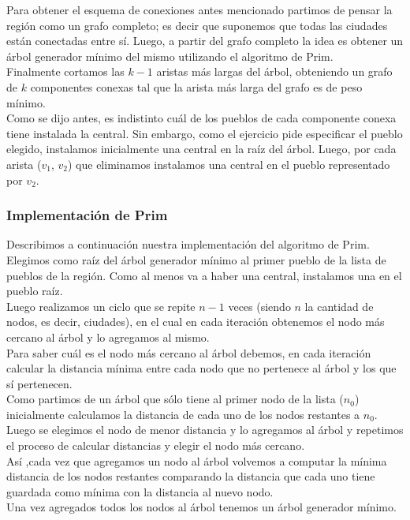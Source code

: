 Para obtener el esquema de conexiones antes mencionado partimos de pensar la regi\'on como un grafo completo; es decir que suponemos que todas las ciudades est\'an conectadas entre s\'i. Luego, a partir del grafo completo la idea es obtener un \'arbol generador m\'inimo del mismo utilizando el algoritmo de Prim.\\
Finalmente cortamos las $k - 1$ aristas m\'as largas del \'arbol, obteniendo un grafo de $k$ componentes conexas tal que la arista m\'as larga del grafo es de peso m\'inimo.\\ 
Como se dijo antes, es indistinto cu\'al de los pueblos de cada componente conexa tiene instalada la central. Sin embargo, como el ejercicio pide especificar el pueblo elegido, instalamos inicialmente una central en la ra\'iz del \'arbol. Luego, por cada arista ($v_1$, $v_2$) que eliminamos instalamos una central en el pueblo representado por $v_2$. %

\subsubsection{Implementaci\'on de Prim}
Describimos a continuaci\'on nuestra implementaci\'on del algoritmo de Prim.\\

Elegimos como ra\'iz del \'arbol generador m\'inimo al primer pueblo de la lista de pueblos de la regi\'on. Como al menos va a haber una central, instalamos una en el pueblo ra\'iz.\\
Luego realizamos un ciclo que se repite $n - 1$ veces (siendo $n$ la cantidad de nodos, es decir, ciudades), en el cual en cada iteraci\'on obtenemos el nodo m\'as cercano al \'arbol y lo agregamos al mismo.\\
Para saber cu\'al es el nodo m\'as cercano al \'arbol debemos, en cada iteraci\'on calcular la distancia m\'inima entre cada nodo que no pertenece al \'arbol y los que s\'i pertenecen.\\
Como partimos de un \'arbol que s\'olo tiene al primer nodo de la lista ($n_0$) inicialmente calculamos la distancia de cada uno de los nodos restantes a $n_0$. Luego se elegimos el nodo de menor distancia y lo agregamos al \'arbol y repetimos el proceso de calcular distancias y elegir el nodo m\'as cercano.\\
As\'i ,cada vez que agregamos un nodo al \'arbol volvemos a computar la m\'inima distancia de los nodos restantes comparando la distancia que cada uno tiene guardada como m\'inima con la distancia al nuevo nodo.\\
Una vez agregados todos los nodos al \'arbol tenemos un \'arbol generador m\'inimo.\\

